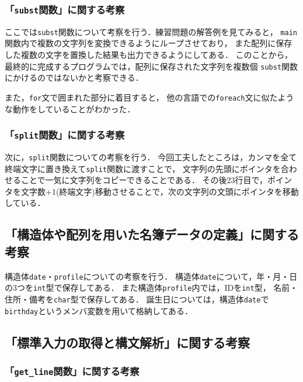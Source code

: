 \documentclass[autodetect-engine,dvi=dvipdfmx,ja=standard,
               a4j,11pt]{bxjsarticle}
\begin{document}
\subsubsection{「\texttt{subst}関数」に関する考察}

ここでは\verb|subst|関数について考察を行う．練習問題の解答例を見てみると，
\verb|main|関数内で複数の文字列を変換できるようにループさせており，
また配列に保存した複数の文字を置換した結果も出力できるようにしてある．
このことから，最終的に完成するプログラムでは，配列に保存された文字列を複数個
\verb|subst|関数にかけるのではないかと考察できる．

また，\verb|for|文で囲まれた部分に着目すると，
他の言語での\verb|foreach|文に似たような動作をしていることがわかった．

\subsubsection{「\texttt{split}関数」に関する考察}

次に，\verb|split|関数についての考察を行う．
今回工夫したところは，カンマを全て終端文字に置き換えて\verb|split|関数に渡すことで，
文字列の先頭にポインタを合わせることで一気に文字列をコピーできることである．
その後23行目で，ポインタを文字数+1(終端文字)移動させることで，次の文字列の文頭にポインタを移動している．

\subsection{「構造体や配列を用いた名簿データの定義」に関する考察}

構造体\verb|date|・\verb|profile|についての考察を行う．
構造体\verb|date|について，年・月・日の3つを\verb|int|型で保存してある．
また構造体\verb|profile|内では，IDを\verb|int|型，
名前・住所・備考を\verb|char|型で保存してある．
誕生日については，構造体\verb|date|で\verb|birthday|というメンバ変数を用いて格納してある．

\subsection{「標準入力の取得と構文解析」に関する考察}

\subsubsection{「\texttt{get\_line}関数」に関する考察}
\end{document}
